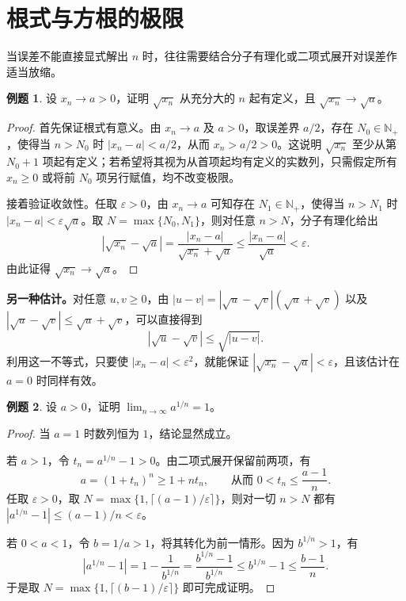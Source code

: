 \documentclass[UTF8, fontset=fandol, a4paper, 12pt]{ctexart}
\newcommand{\Nplus}{\mathbb N_{+}}
\theoremstyle{definition}
\newtheorem{example}{例题}
\begin{document}
\section{根式与方根的极限}
当误差不能直接显式解出 $n$ 时，往往需要结合分子有理化或二项式展开对误差作适当放缩。

\begin{example}
设 $x_n\to a>0$，证明 $\sqrt{x_n}$ 从充分大的 $n$ 起有定义，且 $\sqrt{x_n}\to\sqrt a$。
\end{example}
\begin{proof}
首先保证根式有意义。由 $x_n\to a$ 及 $a>0$，取误差界 $a/2$，存在 $N_0\in\Nplus$，使得当 $n>N_0$ 时 $|x_n-a|<a/2$，从而 $x_n>a/2>0$。这说明 $\sqrt{x_n}$ 至少从第 $N_0+1$ 项起有定义；若希望将其视为从首项起均有定义的实数列，只需假定所有 $x_n\ge0$ 或将前 $N_0$ 项另行赋值，均不改变极限。

接着验证收敛性。任取 $\varepsilon>0$，由 $x_n\to a$ 可知存在 $N_1\in\Nplus$，使得当 $n>N_1$ 时 $|x_n-a|<\varepsilon\sqrt a$。取 $N=\max\{N_0,N_1\}$，则对任意 $n>N$，分子有理化给出
\[
 |\sqrt{x_n}-\sqrt a|
 =\frac{|x_n-a|}{\sqrt{x_n}+\sqrt a}
 \le\frac{|x_n-a|}{\sqrt a}<\varepsilon.
\]
由此证得 $\sqrt{x_n}\to\sqrt a$。
\end{proof}

\noindent\textbf{另一种估计。}对任意 $u,v\ge0$，由 $|u-v|=|\sqrt u-\sqrt v|(\sqrt u+\sqrt v)$ 以及 $|\sqrt u-\sqrt v|\le\sqrt u+\sqrt v$，可以直接得到
\[
 |\sqrt u-\sqrt v|\le\sqrt{|u-v|}.
\]
利用这一不等式，只要使 $|x_n-a|<\varepsilon^2$，就能保证 $|\sqrt{x_n}-\sqrt a|<\varepsilon$，且该估计在 $a=0$ 时同样有效。

\begin{example}
设 $a>0$，证明 $\displaystyle\lim_{n\to\infty}a^{1/n}=1$。
\end{example}
\begin{proof}
当 $a=1$ 时数列恒为 $1$，结论显然成立。

若 $a>1$，令 $t_n=a^{1/n}-1>0$。由二项式展开保留前两项，有
\[
 a=(1+t_n)^n\ge1+nt_n,
 \qquad \text{从而 } 0<t_n\le\frac{a-1}{n}.
\]
任取 $\varepsilon>0$，取 $N=\max\{1,\lceil(a-1)/\varepsilon\rceil\}$，则对一切 $n>N$ 都有 $|a^{1/n}-1|\le(a-1)/n<\varepsilon$。

若 $0<a<1$，令 $b=1/a>1$，将其转化为前一情形。因为 $b^{1/n}>1$，有
\[
 |a^{1/n}-1|=1-\frac1{b^{1/n}}
 =\frac{b^{1/n}-1}{b^{1/n}}\le b^{1/n}-1\le\frac{b-1}{n}.
\]
于是取 $N=\max\{1,\lceil(b-1)/\varepsilon\rceil\}$ 即可完成证明。
\end{proof}
\end{document}
